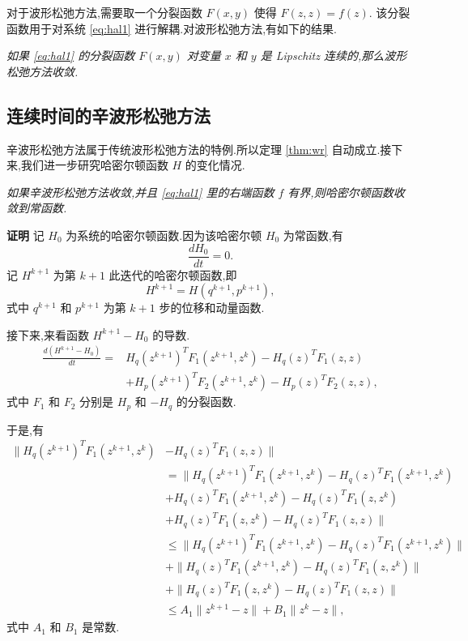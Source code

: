 对于波形松弛方法,需要取一个分裂函数 $F(x,y)$ 使得 $F(z,z)=f(z)$. 该分裂函数用于对系统 \eqref{eq:hal1} 进行解耦.对波形松弛方法,有如下的结果.

\begin{theorem}\label{thm:wr}
	\emph{如果 \eqref{eq:hal1} 的分裂函数 $F(x,y)$ 对变量 $x$ 和 $y$ 是 Lipschitz 连续的,那么波形松弛方法收敛.}
\end{theorem}

\subsection{连续时间的辛波形松弛方法}
辛波形松弛方法属于传统波形松弛方法的特例.所以定理 \ref{thm:wr} 自动成立.接下来,我们进一步研究哈密尔顿函数 $H$ 的变化情况.

\begin{theorem}
\emph{如果辛波形松弛方法收敛,并且 \eqref{eq:hal1} 里的右端函数 $f$ 有界,则哈密尔顿函数收敛到常函数.}
\end{theorem}

{\textbf{证明}} 记 $H_0$ 为系统的哈密尔顿函数.因为该哈密尔顿 $H_0$ 为常函数,有
\begin{equation*}
\frac{dH_0}{dt}=0.
\end{equation*}
记 $H^{k+1}$ 为第 $k+1$ 此迭代的哈密尔顿函数,即
\begin{equation*}
H^{k+1}=H(q^{k+1},p^{k+1}),
\end{equation*}
式中 $q^{k+1}$ 和 $p^{k+1}$ 为第 $k+1$ 步的位移和动量函数.

接下来,来看函数 $H^{k+1}-H_0$ 的导数.
\begin{equation*}
\begin{aligned}
\frac{d(H^{k+1}-H_0)}{dt}=&H_q(z^{k+1})^TF_1(z^{k+1},z^{k})-H_q(z)^TF_1(z,z)\\
&+H_p(z^{k+1})^TF_2(z^{k+1},z^{k})-H_p(z)^TF_2(z,z),
\end{aligned}
\end{equation*}
式中 $F_1$ 和 $F_2$ 分别是 $H_p$ 和 $-H_q$ 的分裂函数.

于是,有
\begin{equation*}
\begin{aligned}
\|H_q(z^{k+1})^TF_1(z^{k+1},z^{k})&-H_q(z)^TF_1(z,z)\|\\
&=\|H_q(z^{k+1})^TF_1(z^{k+1},z^{k})-H_q(z)^TF_1(z^{k+1},z^{k})\\
&+H_q(z)^TF_1(z^{k+1},z^{k})-H_q(z)^TF_1(z,z^{k})\\
&+H_q(z)^TF_1(z,z^{k})-H_q(z)^TF_1(z,z)\|\\
&\le\|H_q(z^{k+1})^TF_1(z^{k+1},z^{k})-H_q(z)^TF_1(z^{k+1},z^{k})\|\\
&+\|H_q(z)^TF_1(z^{k+1},z^{k})-H_q(z)^TF_1(z,z^{k})\|\\
&+\|H_q(z)^TF_1(z,z^{k})-H_q(z)^TF_1(z,z)\|\\
&\le A_1\|z^{k+1}-z\|+B_1\|z^{k}-z\|,
\end{aligned}
\end{equation*}
式中 $A_1$ 和 $B_1$ 是常数.

